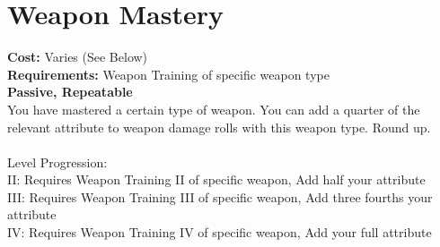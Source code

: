 \section{Weapon Mastery}
\textbf{Cost:} Varies (See Below)\\
\textbf{Requirements:} Weapon Training of specific weapon type\\
\textbf{Passive, Repeatable}\\
You have mastered a certain type of weapon. You can add a quarter of the relevant attribute to weapon damage rolls with this weapon type. Round up.\\
\\
Level Progression:\\
II: Requires Weapon Training II of specific weapon, Add half your attribute\\
III: Requires Weapon Training III of specific weapon, Add three fourths your attribute\\
IV: Requires Weapon Training IV of specific weapon, Add your full attribute\\
\\
